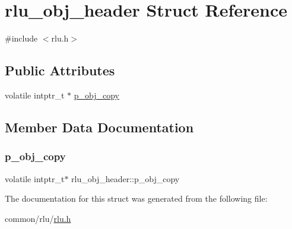 \hypertarget{structrlu__obj__header}{}\section{rlu\+\_\+obj\+\_\+header Struct Reference}
\label{structrlu__obj__header}


{\ttfamily \#include $<$rlu.\+h$>$}

\subsection*{Public Attributes}
\begin{DoxyCompactItemize}
\item 
volatile intptr\+\_\+t $\ast$ \hyperlink{structrlu__obj__header_a3e9a2f4198a525a93e80677cf29d0cf0}{p\+\_\+obj\+\_\+copy}
\end{DoxyCompactItemize}


\subsection{Member Data Documentation}
\mbox{\label{structrlu__obj__header_a3e9a2f4198a525a93e80677cf29d0cf0}} 
\subsubsection{\texorpdfstring{p\+\_\+obj\+\_\+copy}{p\_obj\_copy}}
{\footnotesize\ttfamily volatile intptr\+\_\+t$\ast$ rlu\+\_\+obj\+\_\+header\+::p\+\_\+obj\+\_\+copy}



The documentation for this struct was generated from the following file\+:\begin{DoxyCompactItemize}
\item 
common/rlu/\hyperlink{rlu_8h}{rlu.\+h}\end{DoxyCompactItemize}
